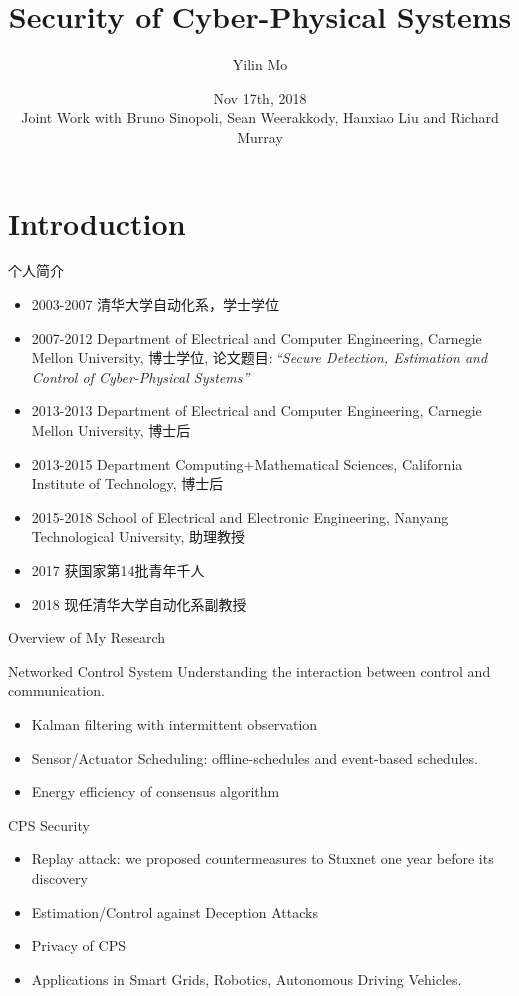 \documentclass[10pt]{beamer}
\title[Secure CPS]{Security of Cyber-Physical Systems}
\author[Yilin Mo]{Yilin Mo}
\institute[Tsinghua]{
  Department of Automation\\ Tsinghua University\\
}
\date[Nov 17, 2018]{ Nov 17th, 2018\\ 
  \small Joint Work with Bruno Sinopoli, Sean Weerakkody, Hanxiao Liu and Richard Murray}
\begin{document}
\maketitle 

\section{Introduction}

\begin{frame}{个人简介}
  \begin{itemize}
  \item  2003-2007  清华大学自动化系，学士学位
  \item  2007-2012 Department of Electrical and Computer Engineering, Carnegie Mellon University, 博士学位, 论文题目:\,\textit{``Secure Detection, Estimation and Control of Cyber-Physical Systems''}
  \item  2013-2013 Department of Electrical and Computer Engineering, Carnegie Mellon University, 博士后
  \item  2013-2015 Department Computing+Mathematical Sciences, California Institute of Technology, 博士后
  \item  2015-2018 School of Electrical and Electronic Engineering, Nanyang Technological University, 助理教授
  \item 2017 获国家第14批青年千人
  \item 2018 现任清华大学自动化系副教授
  \end{itemize}
\end{frame}

\begin{frame}{Overview of My Research}
\begin{block}{Networked Control System}
  Understanding the interaction between control and communication.
 \begin{itemize}
  \item Kalman filtering with intermittent observation
  \item Sensor/Actuator Scheduling: offline-schedules and event-based schedules.
  \item Energy efficiency of consensus algorithm
 \end{itemize}
\end{block}
\begin{block}{CPS Security}
\begin{itemize}
  \item Replay attack: we proposed countermeasures to Stuxnet one year before its discovery
  \item Estimation/Control against Deception Attacks
  \item Privacy of CPS
  \item Applications in Smart Grids, Robotics, Autonomous Driving Vehicles.
\end{itemize}
\end{block}
\end{frame}
\end{document}
